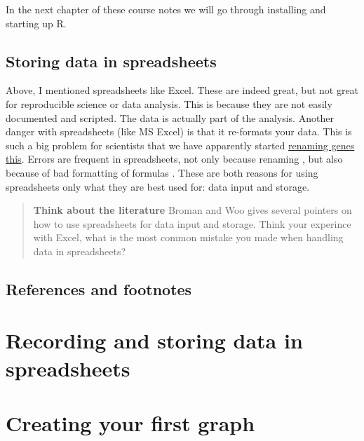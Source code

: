 \documentclass[
  11pt,
]{krantz}
\begin{document}
In the next chapter of these course notes we will go through installing and starting up R.

\hypertarget{storing-data-in-spreadsheets}{%
\section{Storing data in spreadsheets}\label{storing-data-in-spreadsheets}}

Above, I mentioned spreadsheets like Excel. These are indeed great, but not great for reproducible science or data analysis. This is because they are not easily documented and scripted. The data is actually part of the analysis. Another danger with spreadsheets (like MS Excel) is that it re-formats your data. This is such a big problem for scientists that we have apparently started \href{https://www.theverge.com/2020/8/6/21355674/human-genes-rename-microsoft-excel-misreading-dates}{renaming genes this}. Errors are frequent in spreadsheets, not only because renaming \citep{RN2927}, but also because of bad formatting of formulas \citep{RN2928}. These are both reasons for using spreadsheets only what they are best used for: data input and storage.

\begin{quote}
\textbf{Think about the literature} Broman and Woo\citep{RN2391} gives several pointers on how to use spreadsheets for data input and storage. Think your experince with Excel, what is the most common mistake you made when handling data in spreadsheets?
\end{quote}

\hypertarget{references-and-footnotes}{%
\section{References and footnotes}\label{references-and-footnotes}}

\hypertarget{recording-and-storing-data-in-spreadsheets}{%
\chapter{Recording and storing data in spreadsheets}\label{recording-and-storing-data-in-spreadsheets}}

\hypertarget{creating-your-first-graph}{%
\chapter{Creating your first graph}\label{creating-your-first-graph}}
\end{document}
